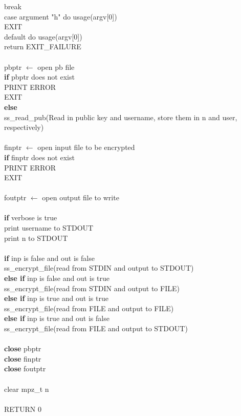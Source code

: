 \documentclass[12pt]{article}
\begin{document}
\indent \indent \indent \indent break \\
\indent \indent \indent case argument "h" do usage(argv[0]) \\
\indent \indent \indent \indent EXIT \\
\indent \indent \indent default do usage(argv[0]) \\
\indent \indent \indent \indent return EXIT\_FAILURE \\
\\
\indent pbptr $\leftarrow$ open pb file\\
\indent \indent \textbf{if} pbptr does not exist \\
\indent \indent \indent PRINT ERROR \\
\indent \indent \indent EXIT \\
\indent \indent \textbf{else} \\
\indent \indent \indent ss\_read\_pub(Read in public key and username, store them in n and user, respectively) \\
\\
\indent finptr $\leftarrow$ open input file to be encrypted\\
\indent \indent \textbf{if} finptr does not exist \\
\indent \indent \indent PRINT ERROR \\
\indent \indent \indent EXIT \\
\\
\indent foutptr $\leftarrow$ open output file to write\\
\\
\indent \textbf{if} verbose is true \\
\indent \indent print username to STDOUT\\
\indent \indent print n to STDOUT \\
\\
\indent \textbf{if} inp is false and out is false \\
\indent\indent ss\_encrypt\_file(read from STDIN and output to STDOUT) \\
\indent \textbf{else if} inp is false and out is true \\
\indent\indent ss\_encrypt\_file(read from STDIN and output to FILE) \\
\indent \textbf{else if} inp is true and out is true \\
\indent\indent ss\_encrypt\_file(read from FILE and output to FILE) \\
\indent \textbf{else if} inp is true and out is false \\
\indent\indent ss\_encrypt\_file(read from FILE and output to STDOUT) \\
\\
\indent \textbf{close} pbptr \\
\indent \textbf{close} finptr \\
\indent \textbf{close} foutptr \\
\\
\indent clear mpz\_t n \\
\\
\indent RETURN 0 \\
\\
\end{document}
